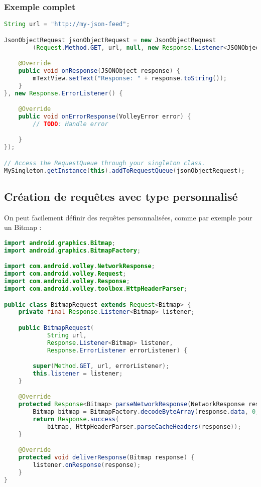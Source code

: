 \subsubsection{Exemple complet}
\begin{lstlisting}[language=java]
String url = "http://my-json-feed";

JsonObjectRequest jsonObjectRequest = new JsonObjectRequest
        (Request.Method.GET, url, null, new Response.Listener<JSONObject>() {

    @Override
    public void onResponse(JSONObject response) {
        mTextView.setText("Response: " + response.toString());
    }
}, new Response.ErrorListener() {

    @Override
    public void onErrorResponse(VolleyError error) {
        // TODO: Handle error

    }
});

// Access the RequestQueue through your singleton class.
MySingleton.getInstance(this).addToRequestQueue(jsonObjectRequest);
\end{lstlisting}

\subsection{Création de requêtes avec type personnalisé}
On peut facilement définir des requêtes personnalisées, comme par exemple pour un Bitmap :
\begin{lstlisting}[language=java]
import android.graphics.Bitmap;
import android.graphics.BitmapFactory;

import com.android.volley.NetworkResponse;
import com.android.volley.Request;
import com.android.volley.Response;
import com.android.volley.toolbox.HttpHeaderParser;

public class BitmapRequest extends Request<Bitmap> {
    private final Response.Listener<Bitmap> listener;

    public BitmapRequest(
            String url,
            Response.Listener<Bitmap> listener,
            Response.ErrorListener errorListener) {

        super(Method.GET, url, errorListener);
        this.listener = listener;
    }

    @Override
    protected Response<Bitmap> parseNetworkResponse(NetworkResponse response) {
        Bitmap bitmap = BitmapFactory.decodeByteArray(response.data, 0, response.data.length);
        return Response.success(
            bitmap, HttpHeaderParser.parseCacheHeaders(response));
    }

    @Override
    protected void deliverResponse(Bitmap response) {
        listener.onResponse(response);
    }
}
\end{lstlisting}
